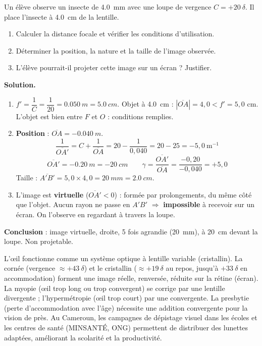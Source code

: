 \documentclass[11pt]{article}
\begin{document}
\begin{exoresolu}
Un élève observe un insecte de \SI{4,0}{mm} avec une loupe de vergence $C = +20\ \delta$. Il place l'insecte à \SI{4,0}{cm} de la lentille.
\begin{enumerate}
\item Calculer la distance focale et vérifier les conditions d'utilisation.
\item Déterminer la position, la nature et la taille de l'image observée.
\item L'élève pourrait-il projeter cette image sur un écran ? Justifier.
\end{enumerate}
\tcblower
\textbf{Solution.}
\begin{enumerate}
\item $f' = \dfrac{1}{C} = \dfrac{1}{20} = \SI{0,050}{m} = \SI{5,0}{cm}$. Objet à \SI{4,0}{cm} : $|\overline{OA}| = 4,0 < f' = 5,0$ cm. L'objet est bien entre $F$ et $O$ : conditions remplies.
\item \textbf{Position} : $\overline{OA} = \SI{-0,040}{m}$.
\[ \frac{1}{\overline{OA'}} = C + \frac{1}{\overline{OA}} = 20 - \frac{1}{0,040} = 20 - 25 = -5,0 \ \text{m}^{-1} \]
\[ \overline{OA'} = \SI{-0,20}{m} = \SI{-20}{cm} \qquad \gamma = \frac{\overline{OA'}}{\overline{OA}} = \frac{-0,20}{-0,040} = +5,0 \]
Taille : $\overline{A'B'} = 5,0 \times 4,0 = \SI{20}{mm} = \SI{2,0}{cm}$.
\item L'image est \textbf{virtuelle} ($\overline{OA'} < 0$) : formée par prolongements, du même côté que l'objet. Aucun rayon ne passe en $A'B'$ $\Rightarrow$ \textbf{impossible} à recevoir sur un écran. On l'observe en regardant à travers la loupe.
\end{enumerate}
\textbf{Conclusion} : image virtuelle, droite, 5 fois agrandie (\SI{20}{mm}), à \SI{20}{cm} devant la loupe. Non projetable.
\end{exoresolu}

\begin{savaistu}
L'œil fonctionne comme un système optique à lentille variable (cristallin). La cornée (vergence $\approx +43\ \delta$) et le cristallin ($\approx +19\ \delta$ au repos, jusqu'à $+33\ \delta$ en accommodation) forment une image réelle, renversée, réduite sur la rétine (écran). La myopie (œil trop long ou trop convergent) se corrige par une lentille divergente ; l'hypermétropie (œil trop court) par une convergente. La presbytie (perte d'accommodation avec l'âge) nécessite une addition convergente pour la vision de près. Au Cameroun, les campagnes de dépistage visuel dans les écoles et les centres de santé (MINSANTÉ, ONG) permettent de distribuer des lunettes adaptées, améliorant la scolarité et la productivité.
\end{savaistu}
\end{document}
